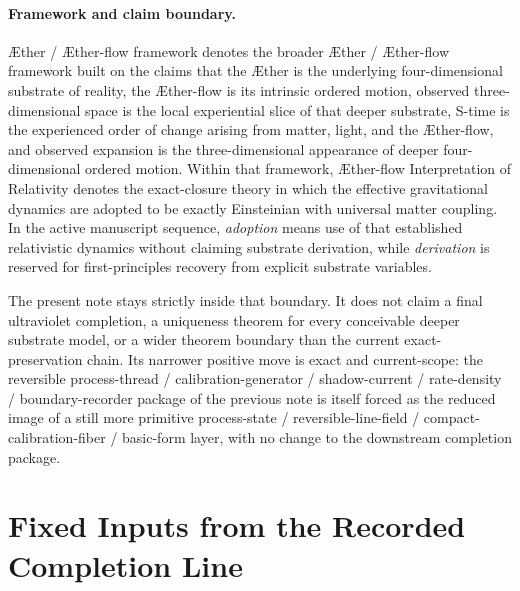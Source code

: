 \documentclass[11pt]{article}
\newcommand{\Aether}{\AE{}ther}
\newcommand{\Aflow}{\AE{}ther-flow}
\newcommand{\TheoryName}{\Aflow{} Interpretation of Relativity}
\newcommand{\TheoryProgram}{\Aether{} / \Aflow{} framework}
\begin{document}
\paragraph{Framework and claim boundary.}
\TheoryProgram{} denotes the broader \Aether{} / \Aflow{} framework built on the claims that the \Aether{} is the underlying four-dimensional substrate of reality, the \Aflow{} is its intrinsic ordered motion, observed three-dimensional space is the local experiential slice of that deeper substrate, S-time is the experienced order of change arising from matter, light, and the \Aflow{}, and observed expansion is the three-dimensional appearance of deeper four-dimensional ordered motion. Within that framework, \TheoryName{} denotes the exact-closure theory in which the effective gravitational dynamics are adopted to be exactly Einsteinian with universal matter coupling. In the active manuscript sequence, \emph{adoption} means use of that established relativistic dynamics without claiming substrate derivation, while \emph{derivation} is reserved for first-principles recovery from explicit substrate variables.

The present note stays strictly inside that boundary. It does not claim a final ultraviolet completion, a uniqueness theorem for every conceivable deeper substrate model, or a wider theorem boundary than the current exact-preservation chain. Its narrower positive move is exact and current-scope: the reversible process-thread / calibration-generator / shadow-current / rate-density / boundary-recorder package of the previous note is itself forced as the reduced image of a still more primitive process-state / reversible-line-field / compact-calibration-fiber / basic-form layer, with no change to the downstream completion package.

\section{Fixed Inputs from the Recorded Completion Line}
\end{document}
